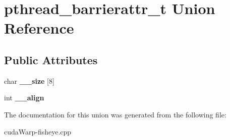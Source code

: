\hypertarget{unionpthread__barrierattr__t}{}\section{pthread\+\_\+barrierattr\+\_\+t Union Reference}
\label{unionpthread__barrierattr__t}
\subsection*{Public Attributes}
\begin{DoxyCompactItemize}
\item 
char {\bfseries \+\_\+\+\_\+size} \mbox{[}8\mbox{]}\hypertarget{unionpthread__barrierattr__t_a7a31ca4eabaadbc37978ebe13368cc1f}{}\label{unionpthread__barrierattr__t_a7a31ca4eabaadbc37978ebe13368cc1f}

\item 
int {\bfseries \+\_\+\+\_\+align}\hypertarget{unionpthread__barrierattr__t_affc673be91f5bb300851cd5b49d1f9e8}{}\label{unionpthread__barrierattr__t_affc673be91f5bb300851cd5b49d1f9e8}

\end{DoxyCompactItemize}


The documentation for this union was generated from the following file\+:\begin{DoxyCompactItemize}
\item 
cuda\+Warp-\/fisheye.\+cpp\end{DoxyCompactItemize}
